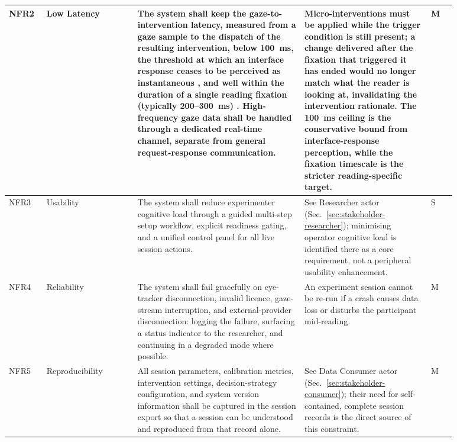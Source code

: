 \begin{longtable}{%
  p{0.07\linewidth}
  p{0.18\linewidth}
  p{0.33\linewidth}
  p{0.25\linewidth}
  p{0.05\linewidth}
}
NFR2 & Low Latency &
  The system shall keep the gaze-to-intervention latency, measured from a
  gaze sample to the dispatch of the resulting intervention, below
  100~ms, the threshold at which an interface response ceases to be
  perceived as instantaneous \cite{miller1968response, nielsen1993responsetime},
  and well within the duration of a single reading fixation
  (typically 200--300~ms) \cite{rayner1998eyemovements}.
  High-frequency gaze data shall be handled through a dedicated real-time
  channel, separate from general request-response communication. &
  Micro-interventions must be applied while the trigger condition is still
  present; a change delivered after the fixation that triggered it has
  ended would no longer match what the reader is looking at, invalidating
  the intervention rationale. The 100~ms ceiling is the conservative bound
  from interface-response perception, while the fixation timescale is the
  stricter reading-specific target. & M \\
\midrule

NFR3 & Usability &
  The system shall reduce experimenter cognitive load through a guided
  multi-step setup workflow, explicit readiness gating, and a unified
  control panel for all live session actions. &
  See Researcher actor (Sec.~\ref{sec:stakeholder-researcher});
  minimising operator cognitive load is identified there as a core
  requirement, not a peripheral usability enhancement. & S \\
\midrule

NFR4 & Reliability &
  The system shall fail gracefully on eye-tracker disconnection, invalid
  licence, gaze-stream interruption, and external-provider disconnection:
  logging the failure, surfacing a status indicator to the researcher,
  and continuing in a degraded mode where possible. &
  An experiment session cannot be re-run if a crash causes data loss or
  disturbs the participant mid-reading. & M \\
\midrule

NFR5 & Reproducibility &
  All session parameters, calibration metrics, intervention settings,
  decision-strategy configuration, and system version information shall
  be captured in the session export so that a session can be understood
  and reproduced from that record alone. &
  See Data Consumer actor (Sec.~\ref{sec:stakeholder-consumer});
  their need for self-contained, complete session records is the direct
  source of this constraint. & M \\
\midrule


\end{longtable}
